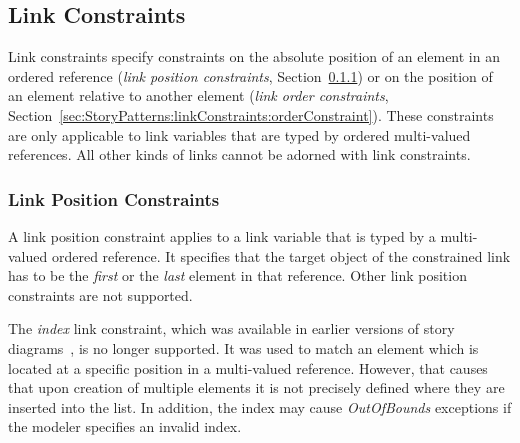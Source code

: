{
\subsection{Link Constraints}
\label{sec:StoryPatterns:linkConstraints}


Link constraints specify constraints on the absolute position of an element in an ordered reference (\emph{link position constraints}, Section~\ref{sec:StoryPatterns:linkConstraints:posConstraint}) or on the position of an element relative to another element (\emph{link order constraints}, Section~\ref{sec:StoryPatterns:linkConstraints:orderConstraint}). These constraints are only applicable to link variables that are typed by ordered multi-valued references. All other kinds of links cannot be adorned with link constraints.



\subsubsection{Link Position Constraints}
\label{sec:StoryPatterns:linkConstraints:posConstraint}

A link position constraint applies to a link variable that is typed by a multi-valued ordered reference. It specifies that the target object of the constrained link has to be the \emph{first} or the \emph{last} element in that reference. Other link position constraints are not supported. 

The \emph{index} link constraint, which was available in earlier versions of story diagrams~\cite{WW01_ag}, is no longer supported. 
It was used to match an element which is located at a specific position in a multi-valued reference. 
However, that causes that upon creation of multiple elements it is not precisely defined where they are inserted into the list. 
In addition, the index may cause \emph{OutOfBounds} exceptions if the modeler specifies an invalid index.

}
